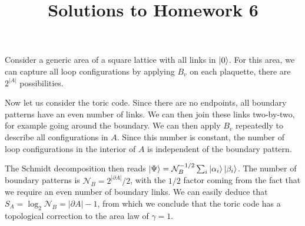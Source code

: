 \documentclass[a4paper,10pt,twoside]{article}
\begin{document}
\title{\vspace{-1cm}\sffamily Solutions to Homework 6\vspace{-1cm}}
\author{}
\date{}
\maketitle
\thispagestyle{fancy}

\begin{section}{}
Consider a generic area of a square lattice with all links in $\ket{0}$.
For this area, we can capture all loop configurations by applying $B_v$ on each plaquette, there are $2^{|A|}$ possibilities.

Now let us consider the toric code.
Since there are no endpoints, all boundary patterns have an even number of links.
We can then join these links two-by-two, for example going around the boundary.
We can then apply $B_v$ repeatedly to describe all configurations in $A$. 
Since this number is constant, the number of loop configurations in the interior of $A$ is independent of the boundary pattern.

The Schmidt decomposition then reads $\ket{\Psi} = \mathcal{N}_B^{-1/2}\sum_i \ket{\alpha_i} \ket{\beta_i}$.
The number of boundary patterns is $\mathcal{N}_B = 2^{|\partial A|}/2$, with the $1/2$ factor coming from the fact that we require an even number of boundary links.
We can easily deduce that $S_A = \log_2\mathcal{N}_B = |\partial A| - 1$, from which we conclude that the toric code has a topological correction to the area law of $\gamma = 1$.
\end{section}
\end{document}

